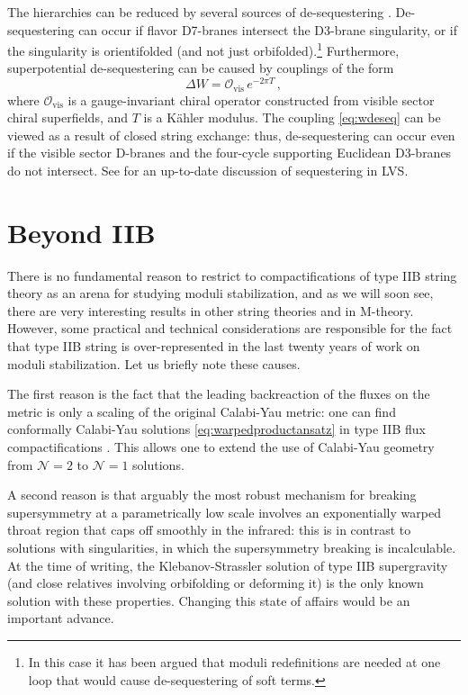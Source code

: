 \documentclass[12pt,a4wide]{article}
\begin{document}
The hierarchies can be reduced by several sources of de-sequestering \cite{Berg:2010ha, Conlon:2011jq, Berg:2012aq}. De-sequestering can occur if flavor D7-branes intersect the D3-brane singularity, or if the singularity is orientifolded (and not just orbifolded).\footnote{In this case it has been argued that moduli redefinitions are needed at one loop that would cause de-sequestering of soft terms\cite{Conlon:2010ji}.} Furthermore, superpotential de-sequestering can be caused by couplings of the form \cite{Berg:2010ha}
\begin{equation}\label{eq:wdeseq}
    \Delta W = \mathcal{O}_{\text{vis}}\,e^{-2\pi T}\,,
\end{equation} where $\mathcal{O}_{\text{vis}}$ is a gauge-invariant chiral operator constructed from visible sector chiral superfields, and $T$ is a K\"ahler modulus.  The coupling \eqref{eq:wdeseq} can be viewed as a result of closed string exchange: thus, de-sequestering can occur even if the visible sector D-branes and the four-cycle supporting Euclidean D3-branes do not intersect.
See  \cite{Cicoli:2023gbd} for an up-to-date discussion of sequestering in LVS. 


\section{Beyond IIB}\label{eq:beyondiib}

There is no fundamental reason to restrict to compactifications of type IIB string theory as an arena for studying
moduli stabilization, and as we will soon see, there are very interesting results in other string theories and in M-theory.
However, some practical and technical considerations are responsible for the fact that type IIB string is over-represented in the last twenty years of work on moduli stabilization.  Let us briefly note these causes. 

The first reason is the fact that the leading backreaction of the fluxes on the metric is only a scaling of the original Calabi-Yau metric: one can find conformally Calabi-Yau solutions \eqref{eq:warpedproductansatz} in type IIB flux compactifications \cite{Giddings:2001yu}.  This allows one to extend the use of Calabi-Yau geometry from $\mathcal{N}=2$ to $\mathcal{N}=1$ solutions.

A second reason is that arguably the most robust mechanism for breaking supersymmetry at a parametrically low scale \cite{Kachru:2002gs} involves an exponentially warped throat region that caps off smoothly in the infrared: this is in contrast to solutions with singularities, in which the supersymmetry breaking is incalculable.
At the time of writing, the Klebanov-Strassler solution \cite{Klebanov:2000hb} of type IIB supergravity (and close relatives involving orbifolding or deforming it) is the only known solution with these properties.  Changing this state of affairs would be an important advance.
\end{document}
